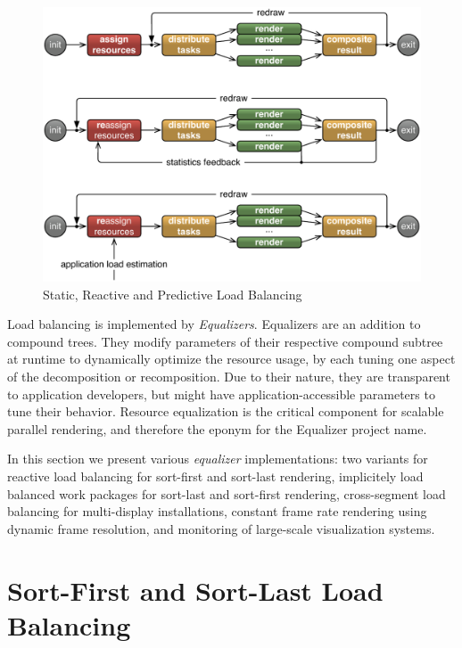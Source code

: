 \begin{figure}[h!t]
  \includegraphics[width=\textwidth]{images/loadBalancing}
  \caption{\label{floadbalancing}Static, Reactive and Predictive Load Balancing}
\end{figure}

Load balancing is implemented by {\em Equalizers}. Equalizers are an addition
to compound trees. They modify parameters of their respective compound subtree
at runtime to dynamically optimize the resource usage, by each tuning one
aspect of the decomposition or recomposition. Due to their nature, they are
transparent to application developers, but might have application-accessible
parameters to tune their behavior. Resource equalization is the critical
component for scalable parallel rendering, and therefore the eponym for the
\textsf{Equalizer} project name.

In this section we present various {\em equalizer} implementations: two
variants for reactive load balancing for sort-first and sort-last rendering,
implicitely load balanced work packages for sort-last and sort-first rendering,
cross-segment load balancing for multi-display installations, constant frame
rate rendering using dynamic frame resolution, and monitoring of large-scale
visualization systems.

\section{Sort-First and Sort-Last Load Balancing}\label{sLoadEqualizer}

